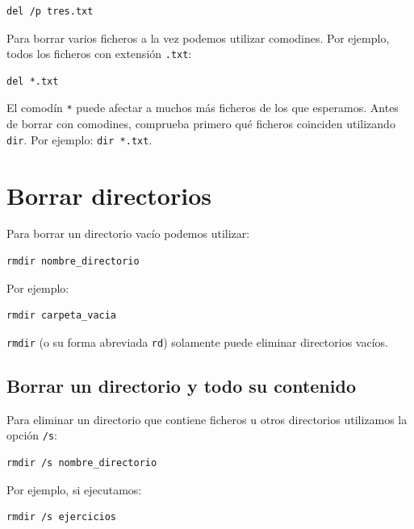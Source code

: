 \documentclass[11pt,a4paper]{article}
\begin{document}
\begin{lstlisting}
del /p tres.txt
\end{lstlisting}

\noindent Para borrar varios ficheros a la vez podemos utilizar
comodines. Por ejemplo, todos los ficheros con extensión
\texttt{.txt}:

\begin{lstlisting}
del *.txt
\end{lstlisting}

\begin{peligro}
El comodín \texttt{*} puede afectar a muchos más ficheros de los que
esperamos. Antes de borrar con comodines, comprueba primero qué
ficheros coinciden utilizando \texttt{dir}. Por ejemplo:
\texttt{dir *.txt}.
\end{peligro}

\section{Borrar directorios}

Para borrar un directorio vacío podemos utilizar:

\begin{lstlisting}
rmdir nombre_directorio
\end{lstlisting}

\noindent Por ejemplo:

\begin{lstlisting}
rmdir carpeta_vacia
\end{lstlisting}

\noindent \texttt{rmdir} (o su forma abreviada \texttt{rd})
solamente puede eliminar directorios vacíos.

\subsection{Borrar un directorio y todo su contenido}

Para eliminar un directorio que contiene ficheros u otros
directorios utilizamos la opción \texttt{/s}:

\begin{lstlisting}
rmdir /s nombre_directorio
\end{lstlisting}

\noindent Por ejemplo, si ejecutamos:

\begin{lstlisting}
rmdir /s ejercicios
\end{lstlisting}
\end{document}

